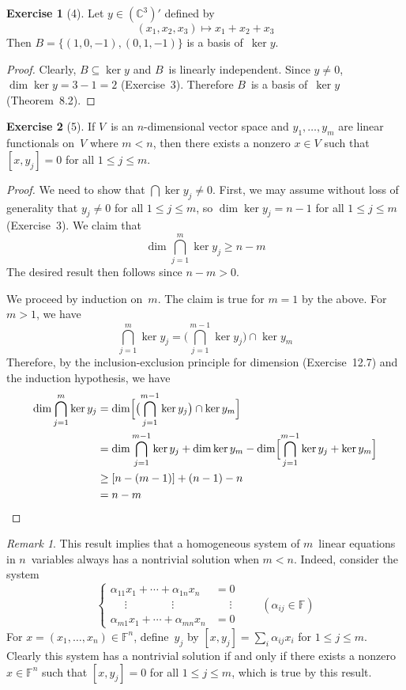 \documentclass[letterpaper,12pt]{article}
\newcommand{\F}{\mathbb{F}}
\newcommand{\C}{\mathbb{C}}
\newcommand{\sect}{\cap}
\newcommand{\bigsect}{\bigcap}
\theoremstyle{definition}
\newtheorem*{exer}{Exercise}
\theoremstyle{remark}
\newtheorem*{rmk}{Remark}
\theoremstyle{direction}
\begin{document}
\begin{exer}[4]
Let \(y\in(\C^3)'\) defined by
\[(x_1,x_2,x_3)\mapsto x_1+x_2+x_3\]
Then \(B=\{(1,0,-1),(0,1,-1)\}\) is a basis of~\(\ker y\).
\end{exer}
\begin{proof}
Clearly, \(B\subseteq\ker y\) and \(B\)~is linearly independent. Since \(y\ne0\), \(\dim\ker y=3-1=2\) (Exercise~3). Therefore \(B\)~is a basis of~\(\ker y\) (Theorem~8.2).
\end{proof}

\begin{exer}[5]
If \(V\)~is an \(n\)-dimensional vector space and \(y_1,\ldots,y_m\) are linear functionals on~\(V\) where \(m<n\), then there exists a nonzero \(x\in V\) such that \([x,y_j]=0\) for all \(1\le j\le m\).
\end{exer}
\begin{proof}
We need to show that \(\bigsect\ker y_j\ne0\). First, we may assume without loss of generality that \(y_j\ne0\) for all \(1\le j\le m\), so \(\dim\ker y_j=n-1\) for all \(1\le j\le m\) (Exercise~3). We claim that
\[\dim\bigsect_{j=1}^m\ker y_j\ge n-m\]
The desired result then follows since \(n-m>0\).

We proceed by induction on~\(m\). The claim is true for \(m=1\) by the above. For \(m>1\), we have
\[\bigsect_{j=1}^m\ker y_j=\bigl(\bigsect_{j=1}^{m-1}\ker y_j\bigr)\sect\ker y_m\]
Therefore, by the inclusion-exclusion principle for dimension (Exercise~12.7) and the induction hypothesis, we have
\begin{align*}
\dim\bigsect_{j=1}^m\ker y_j&=\dim\Bigl[\bigl(\bigsect_{j=1}^{m-1}\ker y_j\bigr)\sect\ker y_m\Bigr]\\
	&=\dim\bigsect_{j=1}^{m-1}\ker y_j+\dim\ker y_m-\dim\Bigl[\bigsect_{j=1}^{m-1}\ker y_j+\ker y_m\Bigr]\\
	&\ge[n-(m-1)]+(n-1)-n\\
	&=n-m\qedhere
\end{align*}
\end{proof}
\begin{rmk}
This result implies that a homogeneous system of \(m\)~linear equations in \(n\)~variables always has a nontrivial solution when \(m<n\). Indeed, consider the system
\begin{equation*}
\left\lbrace
\begin{aligned}
\alpha_{11}x_1+\cdots+\alpha_{1n}x_n&=0\\
\phantom{\alpha_{i1}}\vdots\phantom{+\cdots+a_{in}}\vdots\phantom{x_{in}}&\phantom{=}\vdots\\
\alpha_{m1}x_1+\cdots+\alpha_{mn}x_n&=0
\end{aligned}
\right.\qquad(\alpha_{ij}\in\F)
\end{equation*}
For \(x=(x_1,\ldots,x_n)\in\F^n\), define~\(y_j\) by \([x,y_j]=\sum_i\alpha_{ij}x_i\) for \(1\le j\le m\). Clearly this system has a nontrivial solution if and only if there exists a nonzero \(x\in\F^n\) such that \([x,y_j]=0\) for all \(1\le j\le m\), which is true by this result.
\end{rmk}
\end{document}
